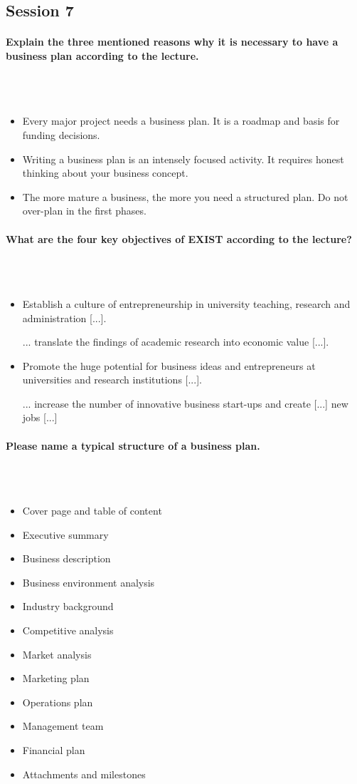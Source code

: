 \documentclass[10pt,a4paper,noendnumber=true]{scrartcl}
\newcommand{\properparagraph}[1]{\paragraph{\textcolor{Emerald}{#1}}\mbox{}\\}
\begin{document}
\subsection{Session 7}
\properparagraph{Explain the three mentioned reasons why it is necessary to have a business plan according to the lecture.}
\\[-6ex]
\begin{itemize}
	\item Every major project needs a business plan. It is a roadmap and basis for
	funding decisions.
	\item Writing a business plan is an intensely focused activity. It requires honest
	thinking about your business concept.
	\item The more mature a business, the more you need a structured plan. Do not over-plan in the first phases.
\end{itemize}


\properparagraph{What are the four key objectives of EXIST according to the lecture?}
\\[-6ex]
\begin{itemize}
	\item Establish a culture of entrepreneurship in
	university teaching, research and
	administration [...].
	\item [...] translate the findings of academic
	research into economic value [...].
	\item Promote the huge potential for business
	ideas and entrepreneurs at universities
	and research institutions [...].
	\item [...] increase the number of innovative
	business start-ups and create [...] new
	jobs [...]
\end{itemize}

\properparagraph{Please name a typical structure of a business plan.}
\\[-6ex]
\begin{itemize}
	\item Cover page and table of content
	\item Executive summary
	\item Business description
	\item Business environment analysis
	\item Industry background
	\item Competitive analysis
	\item Market analysis
	\item Marketing plan
	\item Operations plan
	\item Management team
	\item Financial plan
	\item Attachments and milestones
\end{itemize}
\end{document}
